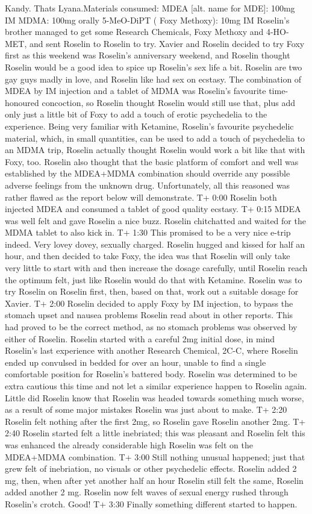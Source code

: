 \documentclass[12pt]{book}
\begin{document}
Kandy. Thats Lyana.Materials consumed: MDEA [alt. name for MDE]: 100mg IM MDMA: 100mg orally 5-MeO-DiPT ( Foxy Methoxy): 10mg IM Roselin's brother managed to get some Research Chemicals, Foxy Methoxy and 4-HO-MET, and sent Roselin to Roselin to try. Xavier and Roselin decided to try Foxy first as this weekend was Roselin's anniversary weekend, and Roselin thought Roselin would be a good idea to spice up Roselin's sex life a bit. Roselin are two gay guys madly in love, and Roselin like had sex on ecstasy. The combination of MDEA by IM injection and a tablet of MDMA was Roselin's favourite time-honoured concoction, so Roselin thought Roselin would still use that, plus add only just a little bit of Foxy to add a touch of erotic psychedelia to the experience. Being very familiar with Ketamine, Roselin's favourite psychedelic material, which, in small quantities, can be used to add a touch of psychedelia to an MDMA trip, Roselin actually thought Roselin would work a bit like that with Foxy, too. Roselin also thought that the basic platform of comfort and well was established by the MDEA+MDMA combination should override any possible adverse feelings from the unknown drug. Unfortunately, all this reasoned was rather flawed as the report below will demonstrate. T+ 0:00 Roselin both injected MDEA and consumed a tablet of good quality ecstasy. T+ 0:15 MDEA was well felt and gave Roselin a nice buzz. Roselin chitchatted and waited for the MDMA tablet to also kick in. T+ 1:30 This promised to be a very nice e-trip indeed. Very lovey dovey, sexually charged. Roselin hugged and kissed for half an hour, and then decided to take Foxy, the idea was that Roselin will only take very little to start with and then increase the dosage carefully, until Roselin reach the optimum felt, just like Roselin would do that with Ketamine. Roselin was to try Roselin on Roselin first, then, based on that, work out a suitable dosage for Xavier. T+ 2:00 Roselin decided to apply Foxy by IM injection, to bypass the stomach upset and nausea problems Roselin read about in other reports. This had proved to be the correct method, as no stomach problems was observed by either of Roselin. Roselin started with a careful 2mg initial dose,  in mind Roselin's last experience with another Research Chemical, 2C-C, where Roselin ended up convulsed in bedded for over an hour, unable to find a single comfortable position for Roselin's battered body. Roselin was determined to be extra cautious this time and not let a similar experience happen to Roselin again. Little did Roselin know that Roselin was headed towards something much worse, as a result of some major mistakes Roselin was just about to make. T+ 2:20 Roselin felt nothing after the first 2mg, so Roselin gave Roselin another 2mg. T+ 2:40 Roselin started felt a little inebriated; this was pleasant and Roselin felt this was enhanced the already considerable high Roselin was felt on the MDEA+MDMA combination. T+ 3:00 Still nothing unusual happened; just that grew felt of inebriation, no visuals or other psychedelic effects. Roselin added 2 mg, then, when after yet another half an hour Roselin still felt the same, Roselin added another 2 mg. Roselin now felt waves of sexual energy rushed through Roselin's crotch. Good! T+ 3:30 Finally something different started to happen. 
\end{document}
